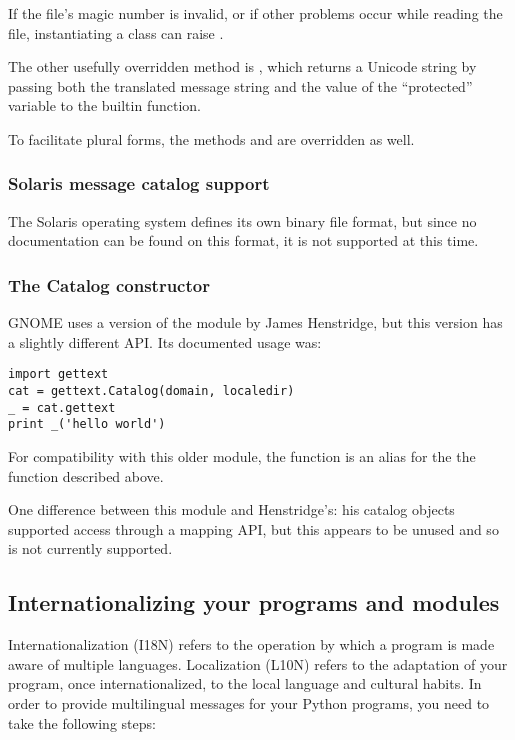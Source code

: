 If the  file's magic number is invalid, or if other problems
occur while reading the file, instantiating a  class
can raise .

The other usefully overridden method is , which
returns a Unicode string by passing both the translated message string
and the value of the ``protected''  variable to the
builtin  function.

To facilitate plural forms, the methods  and
 are overridden as well.

\subsubsection{Solaris message catalog support}

The Solaris operating system defines its own binary
 file format, but since no documentation can be found on
this format, it is not supported at this time.

\subsubsection{The Catalog constructor}

GNOME uses a version of the  module by
James Henstridge, but this version has a slightly different API.  Its
documented usage was:

\begin{verbatim}
import gettext
cat = gettext.Catalog(domain, localedir)
_ = cat.gettext
print _('hello world')
\end{verbatim}

For compatibility with this older module, the function
 is an alias for the the 
function described above.

One difference between this module and Henstridge's: his catalog
objects supported access through a mapping API, but this appears to be
unused and so is not currently supported.

\subsection{Internationalizing your programs and modules}
Internationalization (I18N) refers to the operation by which a program
is made aware of multiple languages.  Localization (L10N) refers to
the adaptation of your program, once internationalized, to the local
language and cultural habits.  In order to provide multilingual
messages for your Python programs, you need to take the following
steps:

